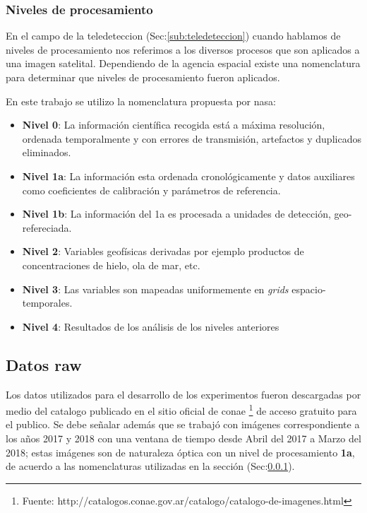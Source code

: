 \subsubsection{Niveles de procesamiento}\label{sub:nivelesdeprocesamiento}

En el campo de la teledeteccion (Sec:\ref{sub:teledeteccion}) cuando hablamos de niveles de procesamiento nos referimos a los diversos procesos que son aplicados a una imagen satelital. Dependiendo de la agencia espacial existe una nomenclatura para determinar que niveles de procesamiento fueron aplicados.

En este trabajo se utilizo la nomenclatura propuesta por \ac{nasa}:
\begin{itemize}
	\item \textbf{Nivel 0}: La información científica recogida está a máxima resolución, ordenada temporalmente y con errores de transmisión, artefactos y duplicados eliminados.
 	\item \textbf{Nivel 1a}: La información esta ordenada cronológicamente y datos auxiliares como coeficientes de calibración y parámetros de referencia.
 	\item \textbf{Nivel 1b}: La información del 1a es procesada a unidades de detección, geo-refereciada.
 	\item \textbf{Nivel 2}: Variables geofísicas derivadas por ejemplo productos de concentraciones de hielo, ola de mar, etc.
 	\item \textbf{Nivel 3}: Las variables son mapeadas uniformemente en \textit{grids} espacio-temporales.
 	\item \textbf{Nivel 4}: Resultados de los análisis de los niveles anteriores
\end{itemize}


\subsection{Datos raw}\label{sec:datosutilizados}

Los datos utilizados para el desarrollo de los experimentos fueron descargadas por medio del catalogo  publicado en el sitio oficial de \ac{conae} \footnote{Fuente: http://catalogos.conae.gov.ar/catalogo/catalogo-de-imagenes.html} de acceso gratuito para el publico. Se debe señalar además que se trabajó con imágenes correspondiente a los años 2017 y 2018 con una ventana de tiempo desde Abril del 2017 a Marzo del 2018; estas imágenes son de naturaleza óptica con un nivel de procesamiento \textbf{1a}, de acuerdo a las nomenclaturas utilizadas en la sección (Sec:\ref{sub:nivelesdeprocesamiento}).

